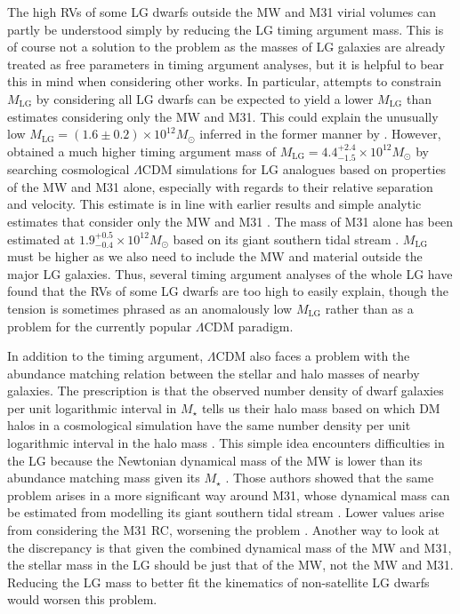\documentclass[fleqn,usenatbib,useAMS,onecolumn]{mnras} %
\begin{document}
The high RVs of some LG dwarfs outside the MW and M31 virial volumes can partly be understood simply by reducing the LG timing argument mass. This is of course not a solution to the problem as the masses of LG galaxies are already treated as free parameters in timing argument analyses, but it is helpful to bear this in mind when considering other works. In particular, attempts to constrain $M_\text{LG}$ by considering all LG dwarfs can be expected to yield a lower $M_\text{LG}$ than estimates considering only the MW and M31. This could explain the unusually low $M_\text{LG} = \left( 1.6 \pm 0.2 \right) \times 10^{12} M_\odot$ inferred in the former manner by \citet{Kashibadze_2018}. However, \citet{Zhai_2020} obtained a much higher timing argument mass of $M_\text{LG} = 4.4^{+2.4}_{-1.5} \times 10^{12} M_\odot$ by searching cosmological $\Lambda$CDM simulations for LG analogues based on properties of the MW and M31 alone, especially with regards to their relative separation and velocity. This estimate is in line with earlier results and simple analytic estimates that consider only the MW and M31 \citep{Li_White_2008}. The mass of M31 alone has been estimated at $1.9_{-0.4}^{+0.5} \times 10^{12} M_\odot$ based on its giant southern tidal stream \citep{Fardal_2013}. $M_\text{LG}$ must be higher as we also need to include the MW and material outside the major LG galaxies. Thus, several timing argument analyses of the whole LG have found that the RVs of some LG dwarfs are too high to easily explain, though the tension is sometimes phrased as an anomalously low $M_\text{LG}$ rather than as a problem for the currently popular $\Lambda$CDM paradigm.

In addition to the timing argument, $\Lambda$CDM also faces a problem with the abundance matching relation between the stellar and halo masses of nearby galaxies. The prescription is that the observed number density of dwarf galaxies per unit logarithmic interval in $M_{\star}$ tells us their halo mass based on which DM halos in a cosmological simulation have the same number density per unit logarithmic interval in the halo mass \citep{Behroozi_2013_AM, Moster_2013}. This simple idea encounters difficulties in the LG because the Newtonian dynamical mass of the MW \citep{Wang_2022} is lower than its abundance matching mass given its $M_{\star}$ \citep{McGaugh_Dokkum_2021}. Those authors showed that the same problem arises in a more significant way around M31, whose dynamical mass can be estimated from modelling its giant southern tidal stream \citep{Fardal_2013}. Lower values arise from considering the M31 RC, worsening the problem \citep{Chemin_2009, Kafle_2018}. Another way to look at the discrepancy is that given the combined dynamical mass of the MW and M31, the stellar mass in the LG should be just that of the MW, not the MW and M31. Reducing the LG mass to better fit the kinematics of non-satellite LG dwarfs would worsen this problem.
\end{document}
